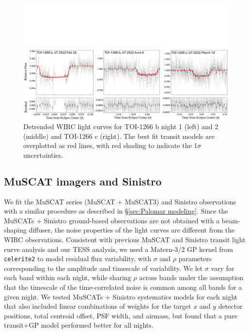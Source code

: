 \documentclass[twocolumn]{aastex631}
\begin{document}
\begin{figure}
\begin{center}
  \includegraphics[width=18cm]{Palomar_Transit_Fig.pdf}
  \caption{Detrended WIRC light curves for TOI-1266 b night 1 (left) and 2 (middle) and TOI-1266 c (right). The best fit transit models are overplotted as red lines, with red shading to indicate the 1$\sigma$ uncertainties.}
  \label{fig:Palomar}
\end{center}
\end{figure}

\subsection{MuSCAT imagers and Sinistro} \label{sec:MuSCAT modeling}

We fit the MuSCAT series (MuSCAT + MuSCAT3) and Sinistro observations with a similar procedure as described in \S\ref{sec:Palomar modeling}. Since the MuSCATs + Sinistro ground-based observations are not obtained with a beam-shaping diffuser, the noise properties of the light curves are different from the WIRC observations. Consistent with previous MuSCAT and Sinistro transit light curve analysis \citep[eg.][]{Kuzuhara2024,Cointepas2024} and our TESS analysis, we used a Matern-3/2 GP kernel from \texttt{celerite2} to model residual flux variability, with $\sigma$ and $\rho$ parameters corresponding to the amplitude and timescale of variability. We let $\sigma$ vary for each band within each night, while sharing $\rho$ across bands under the assumption that the timescale of the time-correlated noise is common among all bands for a given night. We tested MuSCATs + Sinistro systematics models for each night that also included linear combinations of weights for the target $x$ and $y$ detector positions, total centroid offset, PSF width, and airmass, but found that a pure transit+GP model performed better for all nights.
\end{document}

